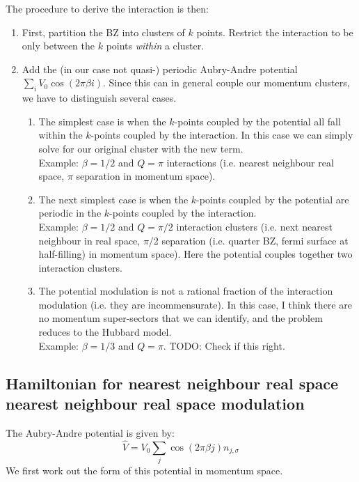 \documentclass[12pt]{article}
\numberwithin{equation}{section}
\begin{document}
The procedure to derive the interaction is then:
\begin{enumerate}
    \item First, partition the BZ into clusters of $k$ points. Restrict the interaction to be only between the $k$ points \textit{within} a cluster.
    \item Add the (in our case not quasi-) periodic Aubry-Andre potential $\sum_{i}V_0\cos(2\pi\beta i)$. Since this can in general couple our momentum clusters, we have to distinguish several cases. 
        \begin{enumerate}
            \item The simplest case is when the $k$-points coupled by the potential all fall within the $k$-points coupled by the interaction. In this case we can simply solve for our original cluster with the new term. \\
            
            Example: $\beta=1/2$ and $Q=\pi$ interactions (i.e. nearest neighbour real space, $\pi$ separation in momentum space).
            \item The next simplest case is when the $k$-points coupled by the potential are periodic in the $k$-points coupled by the interaction. \\
            
            Example: $\beta=1/2$ and $Q=\pi/2$ interaction clusters (i.e. next nearest neighbour in real space, $\pi$/2 separation (i.e. quarter BZ, fermi surface at half-filling) in momentum space). Here the potential couples together two interaction clusters.
            \item The potential modulation is not a rational fraction of the interaction modulation (i.e. they are incommensurate). In this case, I think there are no momentum super-sectors that we can identify, and the problem reduces to the Hubbard model.\\
            
            Example: $\beta=1/3$ and $Q=\pi$. TODO: Check if this right.
         \end{enumerate}
\end{enumerate}

\subsection{Hamiltonian for nearest neighbour real space nearest neighbour real space modulation}
The Aubry-Andre potential is given by:
\begin{equation}
    \hat{V}=V_0\sum_{j}\cos(2\pi\beta j)n_{j,\sigma}
\end{equation}
We first work out the form of this potential in momentum space. 
\end{document}
